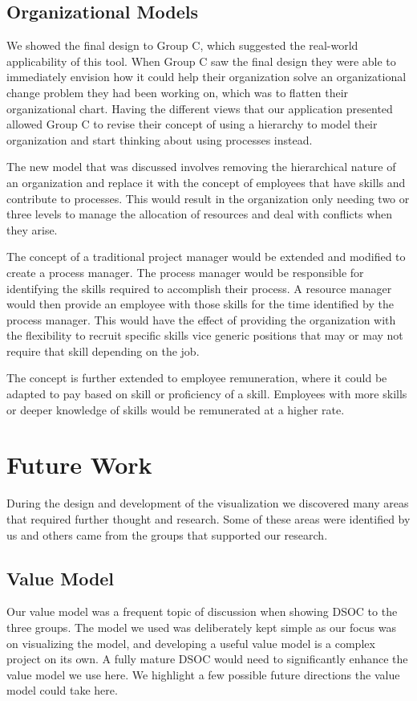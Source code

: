 \documentclass[journal]{vgtc}                %
\begin{document}
\subsection{Organizational Models}
We showed the final design to Group C, which suggested the real-world applicability of this tool. When Group C saw the final design they were able to immediately envision how it could help their organization solve an organizational change problem they had been working on, which was to flatten their organizational chart. Having the different views that our application presented allowed Group C to revise their concept of using a hierarchy to model their organization and start thinking about using processes instead.

The new model that was discussed involves removing the hierarchical nature of an organization and replace it with the concept of employees that have skills and contribute to processes.  This would result in the organization only needing two or three levels to manage the allocation of resources and deal with conflicts when they arise.

The concept of a traditional project manager would be extended and modified to create a process manager.  The process manager would be responsible for identifying the skills required to accomplish their process.  A resource manager would then provide an employee with those skills for the time identified by the process manager.  This would have the effect of providing the organization with the flexibility to recruit specific skills vice generic positions that may or may not require that skill depending on the job.

The concept is further extended to employee remuneration, where it could be adapted to pay based on skill or proficiency of a skill. Employees with more skills or deeper knowledge of skills would be remunerated at a higher rate.

\section{Future Work}
\label{sec:future}
During the design and development of the visualization we discovered many areas that required further thought and research.  Some of these areas were identified by us and others came from the groups that supported our research.

\subsection{Value Model}
Our value model was a frequent topic of discussion when showing DSOC to the three groups. The model we used was deliberately kept simple as our focus was on visualizing the model, and developing a useful value model is a complex project on its own. A fully mature DSOC would need to significantly enhance the value model we use here. We highlight a few possible future directions the value model could take here. 
\end{document}
